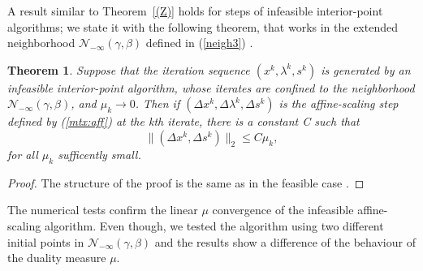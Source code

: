 \documentclass[a4paper,10 pt,titlepage,twoside]{book}
\theoremstyle{plain}
\newtheorem{thm}{Theorem}[chapter]
\theoremstyle{definition}
\theoremstyle{remark}
\begin{document}
A result similar to Theorem~\ref{(Z)} holds for steps of infeasible interior-point algorithms; we state it with the following theorem, that works in the extended neighborhood $\mathcal{N}_{-\infty}(\gamma,\beta)$ defined in (\ref{neigh3}) \cite{Wright}.\\
\begin{thm}
	Suppose that the iteration sequence $(x^{k},\lambda^{k},s^{k})$ is generated by an infeasible interior-point algorithm, whose iterates are confined to the neighborhood $\mathcal{N}_{-\infty}(\gamma,\beta)$, and $\mu_{k}\to 0$. Then if $(\Delta x^{k},\Delta \lambda^{k},\Delta s^{k})$ is the affine-scaling step defined by (\ref{mtx:aff}) at the kth iterate, there is a constant C such that
	\begin{equation*}
		\lVert(\Delta x^{k},\Delta s^{k})\rVert_{2}\leq C\mu_{k},
	\end{equation*}
	for all $\mu_{k}$ sufficently small.
\end{thm}
\begin{proof}
	The structure of the proof is the same as in the feasible case \cite{Wright}.
\end{proof}
The numerical tests confirm the linear $\mu$ convergence of the infeasible affine-scaling algorithm. Even though, we tested the algorithm using two different initial points in $\mathcal{N}_{-\infty}(\gamma,\beta)$ and the results show a difference of the behaviour of the duality measure $\mu$.
\end{document}
